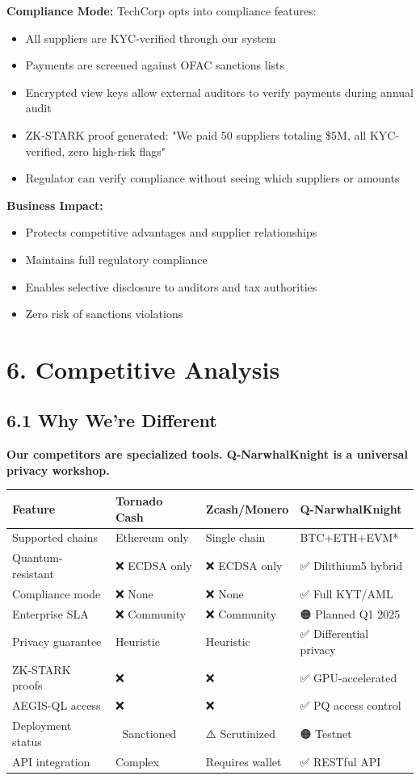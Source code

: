 \documentclass[11pt,a4paper]{article}
\begin{document}
\textbf{Compliance Mode:} TechCorp opts into compliance features:
\begin{itemize}
    \item All suppliers are KYC-verified through our system
    \item Payments are screened against OFAC sanctions lists
    \item Encrypted view keys allow external auditors to verify payments during annual audit
    \item ZK-STARK proof generated: "We paid 50 suppliers totaling \$5M, all KYC-verified, zero high-risk flags"
    \item Regulator can verify compliance without seeing which suppliers or amounts
\end{itemize}

\textbf{Business Impact:}
\begin{itemize}
    \item Protects competitive advantages and supplier relationships
    \item Maintains full regulatory compliance
    \item Enables selective disclosure to auditors and tax authorities
    \item Zero risk of sanctions violations
\end{itemize}

\section{6. Competitive Analysis}

\subsection{6.1 Why We're Different}

\textbf{Our competitors are specialized tools. Q-NarwhalKnight is a universal privacy workshop.}

\begin{table}[h]
\centering
\small
\begin{tabular}{p{3cm}p{3cm}p{3cm}p{3cm}}
\toprule
\textbf{Feature} & \textbf{Tornado Cash} & \textbf{Zcash/Monero} & \textbf{Q-NarwhalKnight} \\
\midrule
Supported chains & Ethereum only & Single chain & BTC+ETH+EVM* \\
Quantum-resistant & ❌ ECDSA only & ❌ ECDSA only & ✅ Dilithium5 hybrid \\
Compliance mode & ❌ None & ❌ None & ✅ Full KYT/AML \\
Enterprise SLA & ❌ Community & ❌ Community & 🟠 Planned Q1 2025 \\
Privacy guarantee & Heuristic & Heuristic & ✅ Differential privacy \\
ZK-STARK proofs & ❌ & ❌ & ✅ GPU-accelerated \\
AEGIS-QL access & ❌ & ❌ & ✅ PQ access control \\
Deployment status & 🚫 Sanctioned & ⚠️ Scrutinized & 🟠 Testnet \\
API integration & Complex & Requires wallet & ✅ RESTful API \\
\bottomrule
\end{tabular}
\end{table}
\end{document}
